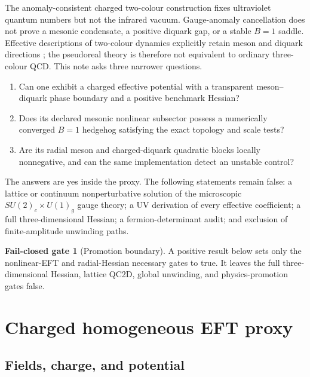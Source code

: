 \documentclass[11pt]{article}
\theoremstyle{definition}
\newtheorem{gate}[proposition]{Fail-closed gate}
\theoremstyle{remark}
\begin{document}
The anomaly-consistent charged two-colour construction fixes ultraviolet
quantum numbers but not the infrared vacuum.  Gauge-anomaly cancellation
does not prove a mesonic condensate, a positive diquark gap, or a stable
\(B=1\) saddle.  Effective descriptions of two-colour dynamics explicitly
retain meson and diquark directions
\cite{SuenagaEtAl2023Proxy,SuenagaEtAl2024Proxy}; the pseudoreal theory is
therefore not equivalent to ordinary three-colour QCD.  This note asks three
narrower questions.
\begin{enumerate}[label=(Q\arabic*)]
\item Can one exhibit a charged effective potential with a transparent
  meson--diquark phase boundary and a positive benchmark Hessian?
\item Does its declared mesonic nonlinear subsector possess a numerically
  converged \(B=1\) hedgehog satisfying the exact topology and scale tests?
\item Are its radial meson and charged-diquark quadratic blocks locally
  nonnegative, and can the same implementation detect an unstable control?
\end{enumerate}

The answers are yes inside the proxy.  The following statements remain
false: a lattice or continuum nonperturbative solution of the microscopic
\(SU(2)_c\times U(1)_g\) gauge theory; a UV derivation of every effective
coefficient; a full three-dimensional Hessian; a fermion-determinant audit;
and exclusion of finite-amplitude unwinding paths.

\begin{gate}[Promotion boundary]
A positive result below sets only the nonlinear-EFT and radial-Hessian
necessary gates to true.  It leaves the full three-dimensional Hessian,
lattice QC2D, global unwinding, and physics-promotion gates false.
\end{gate}

\section{Charged homogeneous EFT proxy}

\subsection{Fields, charge, and potential}
\end{document}

